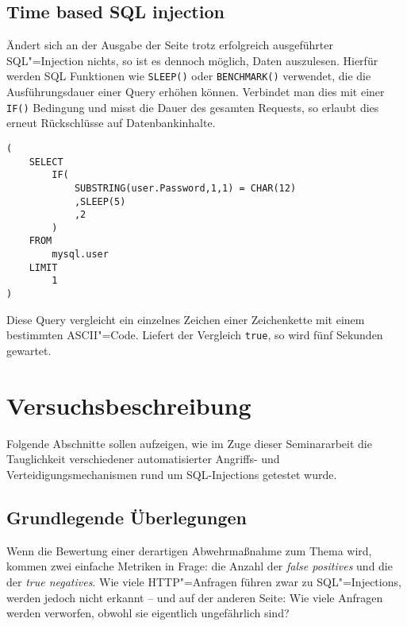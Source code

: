 \section{Time based SQL injection}

Ändert sich an der Ausgabe der Seite trotz erfolgreich ausgeführter SQL"=Injection nichts, so ist es dennoch möglich, Daten auszulesen. Hierfür werden SQL Funktionen wie \texttt{SLEEP()} oder \texttt{BENCHMARK()} verwendet, die die Ausführungsdauer einer Query erhöhen können. Verbindet man dies mit einer \texttt{IF()} Bedingung und misst die Dauer des gesamten Requests, so erlaubt dies erneut Rückschlüsse auf Datenbankinhalte.

\begin{listing}[ht!]
\begin{margincap}
\begin{verbatim}
(
    SELECT
        IF(
            SUBSTRING(user.Password,1,1) = CHAR(12)
            ,SLEEP(5)
            ,2
        )
    FROM
        mysql.user
    LIMIT
        1
)
\end{verbatim}
\caption[timebased]{Diese Query vergleicht ein einzelnes Zeichen einer Zeichenkette mit einem bestimmten ASCII"=Code. Liefert der Vergleich \texttt{true}, so wird fünf Sekunden gewartet.}
\label{lst:time_based}
\end{margincap}
\end{listing}

\chapter{Versuchsbeschreibung}

Folgende Abschnitte sollen aufzeigen, wie im Zuge dieser Seminararbeit die Tauglichkeit verschiedener automatisierter Angriffs- und Verteidigungsmechanismen rund um SQL-Injections getestet wurde.

\section{Grundlegende Überlegungen}

Wenn die Bewertung einer derartigen Abwehrmaßnahme zum Thema wird, kommen zwei einfache Metriken in Frage: die Anzahl der \emph{false positives} und die der \emph{true negatives}. Wie viele HTTP"=Anfragen führen zwar zu SQL"=Injections, werden jedoch nicht erkannt -- und auf der anderen Seite: Wie viele Anfragen werden verworfen, obwohl sie eigentlich ungefährlich sind?

